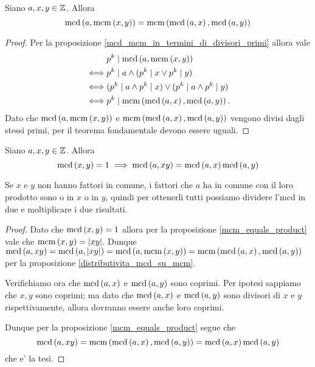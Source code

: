 \begin{proposition} \label{distributivita_mcd_su_mcm}
    Siano $a, x, y \in \mathbb{Z}$. Allora 
    \begin{equation}
        \operatorname{mcd}\left(a, \operatorname{mcm}\left(x, y\right)\right) = \operatorname{mcm}\left(\operatorname{mcd}\left(a, x\right), \operatorname{mcd}\left(a, y\right)\right)
    \end{equation}
\end{proposition}
\begin{proof}
    Per la proposizione \ref{mcd_mcm_in_termini_di_divisori_primi} allora vale
    \begin{alignat*}
        {1}
        &p^k \mid \operatorname{mcd}\left(a, \operatorname{mcm}\left(x, y\right)\right)\\ 
        \iff &p^k \mid a \land (p^k \mid x \lor p^k \mid y)\\
        \iff &(p^k \mid a \land p^k \mid x) \lor (p^k \mid a \land p^k \mid y) \\
        \iff &p^k \mid \operatorname{mcm}\left(\operatorname{mcd}\left(a, x\right), \operatorname{mcd}\left(a, y\right)\right).
    \end{alignat*}
    Dato che $\operatorname{mcd}\left(a, \operatorname{mcm}\left(x, y\right)\right)$ e $\operatorname{mcm}\left(\operatorname{mcd}\left(a, x\right), \operatorname{mcd}\left(a, y\right)\right)$ vengono divisi dagli stessi primi, per il teorema fondamentale devono essere uguali.
\end{proof}

\begin{proposition}
    Siano $a, x, y \in \mathbb{Z}$. Allora 
    \begin{equation}
        \operatorname{mcd}\left(x, y\right) = 1 \implies \operatorname{mcd}\left(a, xy\right) = \operatorname{mcd}\left(a, x\right)\operatorname{mcd}\left(a, y\right)
    \end{equation}
\end{proposition}
\begin{intuition}
    Se $x$ e $y$ non hanno fattori in comune, i fattori che $a$ ha in comune con il loro prodotto sono o in $x$ o in $y$, quindi per ottenerli tutti possiamo dividere l'mcd in due e moltiplicare i due risultati.
\end{intuition}
\begin{proof}
    Dato che $\operatorname{mcd}\left(x, y\right) = 1$ allora per la proposizione \ref{mcm_equals_product} vale che $\operatorname{mcm}\left(x, y\right) = \left|xy\right|$.
    Dunque $\operatorname{mcd}\left(a, xy\right) = \operatorname{mcd}\left(a, \left|xy\right|\right) = \operatorname{mcd}\left(a, \operatorname{mcm}\left(x, y\right)\right) = \operatorname{mcm}\left(\operatorname{mcd}\left(a, x\right), \operatorname{mcd}\left(a, y\right)\right)$ per la proposizione \ref{distributivita_mcd_su_mcm}.

    Verifichiamo ora che $\operatorname{mcd}\left(a, x\right)$ e $\operatorname{mcd}\left(a, y\right)$ sono coprimi. Per ipotesi sappiamo che $x, y$ sono coprimi; ma dato che $\operatorname{mcd}\left(a, x\right)$ e $\operatorname{mcd}\left(a, y\right)$ sono divisori di $x$ e $y$ rispettivamente, allora dovranno essere anche loro coprimi.

    Dunque per la proposizione \ref{mcm_equals_product} segue che \[
        \operatorname{mcd}\left(a, xy\right) = \operatorname{mcm}\left(\operatorname{mcd}\left(a, x\right), \operatorname{mcd}\left(a, y\right)\right) = \operatorname{mcd}\left(a, x\right)\operatorname{mcd}\left(a, y\right)
    \] che e' la tesi.
\end{proof}

